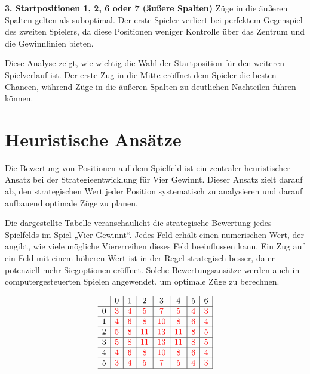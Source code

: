 	\textbf{3. Startpositionen 1, 2, 6 oder 7 (äußere Spalten)}
	Züge in die äußeren Spalten gelten als suboptimal. Der erste Spieler verliert bei perfektem Gegenspiel des zweiten Spielers, da diese Positionen weniger Kontrolle über das Zentrum und die Gewinnlinien bieten.
	
	Diese Analyse zeigt, wie wichtig die Wahl der Startposition für den weiteren Spielverlauf ist. Der erste Zug in die Mitte eröffnet dem Spieler die besten Chancen, während Züge in die äußeren Spalten zu deutlichen Nachteilen führen können.

\section{Heuristische Ansätze}

Die Bewertung von Positionen auf dem Spielfeld ist ein zentraler heuristischer Ansatz bei der Strategieentwicklung für Vier Gewinnt. Dieser Ansatz zielt darauf ab, den strategischen Wert jeder Position systematisch zu analysieren und darauf aufbauend optimale Züge zu planen.

Die dargestellte Tabelle veranschaulicht die strategische Bewertung jedes Spielfelds im Spiel „Vier Gewinnt“. Jedes Feld erhält einen numerischen Wert, der angibt, wie viele mögliche Viererreihen dieses Feld beeinflussen kann. Ein Zug auf ein Feld mit einem höheren Wert ist in der Regel strategisch besser, da er potenziell mehr Siegoptionen eröffnet. Solche Bewertungsansätze werden auch in computergesteuerten Spielen angewendet, um optimale Züge zu berechnen.






	\[
	\begin{array}{c|c|c|c|c|c|c|c|}
		& 0 & 1 & 2 & 3 & 4 & 5 & 6 \\ \hline
		0 & \textcolor{red}{3} & \textcolor{red}{4} & \textcolor{red}{5} & \textcolor{red}{7} & \textcolor{red}{5} & \textcolor{red}{4} & \textcolor{red}{3} \\ \hline
		1 & \textcolor{red}{4} & \textcolor{red}{6} & \textcolor{red}{8} & \textcolor{red}{10} & \textcolor{red}{8} & \textcolor{red}{6} & \textcolor{red}{4} \\ \hline
		2 & \textcolor{red}{5} & \textcolor{red}{8} & \textcolor{red}{11} & \textcolor{red}{13} & \textcolor{red}{11} & \textcolor{red}{8} & \textcolor{red}{5} \\ \hline
		3 & \textcolor{red}{5} & \textcolor{red}{8} & \textcolor{red}{11} & \textcolor{red}{13} & \textcolor{red}{11} & \textcolor{red}{8} & \textcolor{red}{5} \\ \hline
		4 & \textcolor{red}{4} & \textcolor{red}{6} & \textcolor{red}{8} & \textcolor{red}{10} & \textcolor{red}{8} & \textcolor{red}{6} & \textcolor{red}{4} \\ \hline
		5 & \textcolor{red}{3} & \textcolor{red}{4} & \textcolor{red}{5} & \textcolor{red}{7} & \textcolor{red}{5} & \textcolor{red}{4} & \textcolor{red}{3} \\ \hline
	\end{array}
	\]
	
